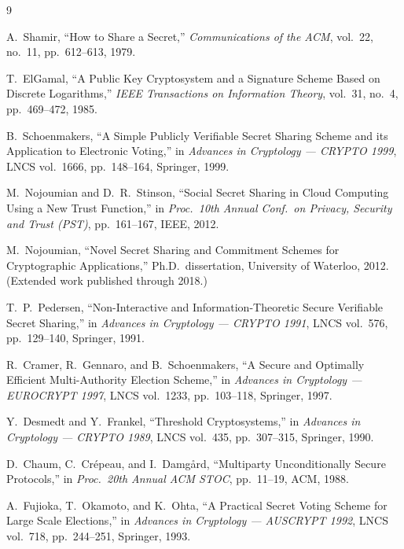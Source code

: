 \documentclass[12pt,a4paper]{article}
\theoremstyle{definition}
\theoremstyle{remark}
\begin{document}

\begin{thebibliography}{9}

A.\ Shamir,
``How to Share a Secret,''
\textit{Communications of the ACM}, vol.~22, no.~11, pp.~612--613, 1979.

T.\ ElGamal,
``A Public Key Cryptosystem and a Signature Scheme Based on Discrete
Logarithms,''
\textit{IEEE Transactions on Information Theory}, vol.~31, no.~4,
pp.~469--472, 1985.

B.\ Schoenmakers,
``A Simple Publicly Verifiable Secret Sharing Scheme and its Application
to Electronic Voting,''
in \textit{Advances in Cryptology --- CRYPTO 1999}, LNCS vol.~1666,
pp.~148--164, Springer, 1999.

M.\ Nojoumian and D.\ R.\ Stinson,
``Social Secret Sharing in Cloud Computing Using a New Trust Function,''
in \textit{Proc.\ 10th Annual Conf.\ on Privacy, Security and Trust (PST)},
pp.~161--167, IEEE, 2012.

M.\ Nojoumian,
``Novel Secret Sharing and Commitment Schemes for Cryptographic
Applications,''
Ph.D.\ dissertation, University of Waterloo, 2012.
(Extended work published through 2018.)

T.\ P.\ Pedersen,
``Non-Interactive and Information-Theoretic Secure Verifiable Secret
Sharing,''
in \textit{Advances in Cryptology --- CRYPTO 1991}, LNCS vol.~576,
pp.~129--140, Springer, 1991.

R.\ Cramer, R.\ Gennaro, and B.\ Schoenmakers,
``A Secure and Optimally Efficient Multi-Authority Election Scheme,''
in \textit{Advances in Cryptology --- EUROCRYPT 1997}, LNCS vol.~1233,
pp.~103--118, Springer, 1997.

Y.\ Desmedt and Y.\ Frankel,
``Threshold Cryptosystems,''
in \textit{Advances in Cryptology --- CRYPTO 1989}, LNCS vol.~435,
pp.~307--315, Springer, 1990.

D.\ Chaum, C.\ Cr{\'e}peau, and I.\ Damg{\aa}rd,
``Multiparty Unconditionally Secure Protocols,''
in \textit{Proc.\ 20th Annual ACM STOC}, pp.~11--19, ACM, 1988.

A.\ Fujioka, T.\ Okamoto, and K.\ Ohta,
``A Practical Secret Voting Scheme for Large Scale Elections,''
in \textit{Advances in Cryptology --- AUSCRYPT 1992},
LNCS vol.~718, pp.~244--251, Springer, 1993.


\end{thebibliography}
\end{document}
